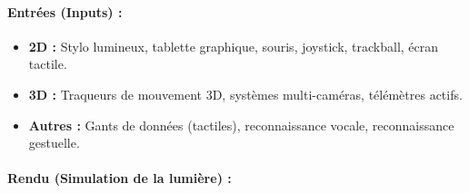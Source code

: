 \documentclass{article}
\begin{document}
\paragraph{Entrées (Inputs) :}
\begin{itemize}
    \item \textbf{2D :} Stylo lumineux, tablette graphique, souris, joystick, trackball, écran tactile.
    \item \textbf{3D :} Traqueurs de mouvement 3D, systèmes multi-caméras, télémètres actifs.
    \item \textbf{Autres :} Gants de données (tactiles), reconnaissance vocale, reconnaissance gestuelle.
\end{itemize}

\paragraph{Rendu (Simulation de la lumière) :}
\end{document}
